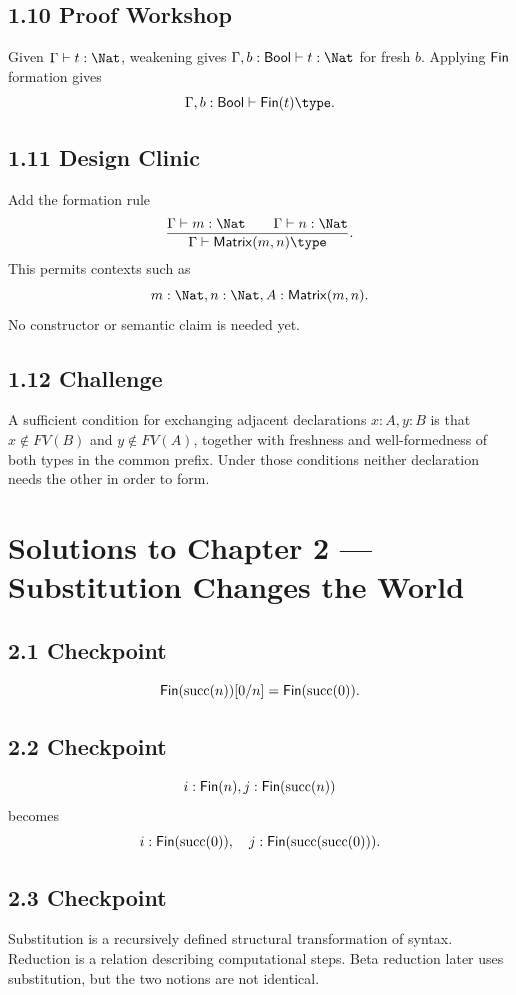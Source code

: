 \documentclass[11pt,openany]{book}
\begin{document}
\section*{1.10 Proof Workshop}
Given $\Gamma\vdash t:\Nat$, weakening gives $\Gamma,b:\mathsf{Bool}\vdash t:\Nat$ for fresh $b$. Applying $\mathsf{Fin}$ formation gives
\[
 \Gamma,b:\mathsf{Bool}\vdash \Fin(t)\type.
\]

\section*{1.11 Design Clinic}
Add the formation rule
\[
\frac{\Gamma\vdash m:\Nat\qquad \Gamma\vdash n:\Nat}
     {\Gamma\vdash \mathsf{Matrix}(m,n)\type}.
\]
This permits contexts such as
\[
 m:\Nat,n:\Nat,A:\mathsf{Matrix}(m,n).
\]
No constructor or semantic claim is needed yet.

\section*{1.12 Challenge}
A sufficient condition for exchanging adjacent declarations $x:A,y:B$ is that $x\notin FV(B)$ and $y\notin FV(A)$, together with freshness and well-formedness of both types in the common prefix. Under those conditions neither declaration needs the other in order to form.

\chapter{Solutions to Chapter 2 — Substitution Changes the World}

\section*{2.1 Checkpoint}
\[
 \mathsf{Fin}(\mathrm{succ}(n))[0/n]
 = \mathsf{Fin}(\mathrm{succ}(0)).
\]

\section*{2.2 Checkpoint}
\[
 i:\mathsf{Fin}(n),j:\mathsf{Fin}(\mathrm{succ}(n))
\]
becomes
\[
 i:\mathsf{Fin}(\mathrm{succ}(0)),
 \quad j:\mathsf{Fin}(\mathrm{succ}(\mathrm{succ}(0))).
\]

\section*{2.3 Checkpoint}
Substitution is a recursively defined structural transformation of syntax. Reduction is a relation describing computational steps. Beta reduction later uses substitution, but the two notions are not identical.
\end{document}
